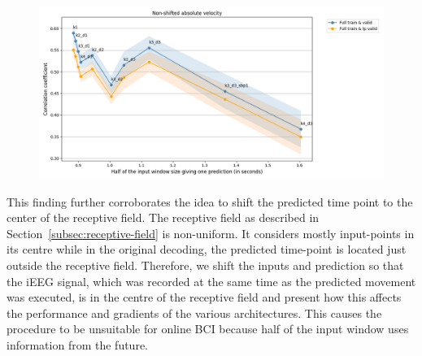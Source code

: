 \begin{figure}
\centering
   \includegraphics[width=1\linewidth]{img/ch4/distance-shifted-performance-absVel}
   \caption{}
\end{figure}\label{fig:figure-distance}

This finding further corroborates the idea to shift the predicted time point to the center of the receptive field.
The receptive field as described in Section~\ref{subsec:receptive-field} is non-uniform.
It considers mostly input-points in its centre while in the original decoding, the predicted time-point is located just outside the receptive field.
Therefore, we shift the inputs and prediction so that the iEEG signal, which was recorded at the same time as the predicted movement was executed, is in the centre of the receptive field and present how this affects the performance and gradients of the various architectures.
This causes the procedure to be unsuitable for online BCI because half of the input window uses information from the future.
